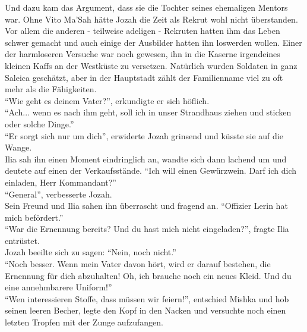 Und dazu kam das Argument, dass sie die Tochter seines ehemaligen Mentors war. Ohne Vito Ma'Sah 
hätte Jozah die Zeit als Rekrut wohl nicht überstanden. Vor allem die anderen - teilweise adeligen 
- Rekruten hatten ihm das Leben schwer gemacht und auch einige der Ausbilder hatten ihn loswerden 
wollen. Einer der harmloseren Versuche war noch gewesen, ihn in die Kaserne irgendeines kleinen 
Kaffs an der Westküste zu versetzen. Natürlich wurden Soldaten in ganz Saleica geschätzt, aber in 
der Hauptstadt zählt der Familienname viel zu oft mehr als die Fähigkeiten.\\
``Wie geht es deinem Vater?'', erkundigte er sich höflich.\\
``Ach... wenn es nach ihm geht, soll ich in unser Strandhaus ziehen und sticken oder solche 
Dinge.''\\
``Er sorgt sich nur um dich'', erwiderte Jozah grinsend und küsste sie auf die Wange.\\
Ilia sah ihn einen Moment eindringlich an, wandte sich dann lachend um und deutete auf einen der 
Verkaufsstände. ``Ich will einen Gewürzwein. Darf ich dich einladen, Herr Kommandant?''\\
``General'', verbesserte Jozah.\\
Sein Freund und Ilia sahen ihn überrascht und fragend an. ``Offizier Lerin hat mich befördert.''\\
``War die Ernennung bereits? Und du hast mich nicht eingeladen?'', fragte Ilia entrüstet.\\
Jozah beeilte sich zu sagen: ``Nein, noch nicht.''\\
``Noch besser. Wenn mein Vater davon hört, wird er darauf bestehen, die Ernennung für dich 
abzuhalten! Oh, ich brauche noch ein neues Kleid. Und du eine annehmbarere Uniform!''\\
``Wen interessieren Stoffe, dass müssen wir feiern!'', entschied Mishka und hob seinen leeren 
Becher, legte den Kopf in den Nacken und versuchte noch einen letzten Tropfen mit der Zunge 
aufzufangen.\\


